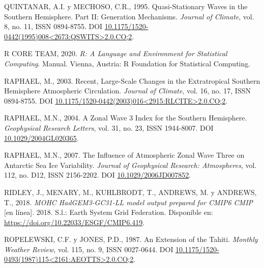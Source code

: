\documentclass[12pt,oneside,a4paper]{reedthesis}
\newlength{\cslhangindent}
\newenvironment{CSLReferences}[2] %
 {%
  \setlength{\parindent}{0pt}
  \ifodd #1 \everypar{\setlength{\hangindent}{\cslhangindent}}\ignorespaces\fi
  \ifnum #2 > 0
  \setlength{\parskip}{#2\baselineskip}
  \fi
 }%
 {}
\begin{document}
\begin{CSLReferences}{1}{0}
\leavevmode{}%
QUINTANAR, A.I. y MECHOSO, C.R., 1995. Quasi-{Stationary Waves} in the {Southern Hemisphere}. {Part II}: {Generation Mechanisms}. \emph{Journal of Climate}, vol. 8, no. 11, ISSN 0894-8755. DOI \href{https://doi.org/10.1175/1520-0442(1995)008\%3C2673:QSWITS\%3E2.0.CO;2}{10.1175/1520-0442(1995)008\textless2673:QSWITS\textgreater2.0.CO;2}.

\leavevmode{}%
R CORE TEAM, 2020. \emph{R: {A} Language and Environment for Statistical Computing}. Manual. {Vienna, Austria}: {R Foundation for Statistical Computing}.

\leavevmode{}%
RAPHAEL, M., 2003. Recent, {Large-Scale Changes} in the {Extratropical Southern Hemisphere Atmospheric Circulation}. \emph{Journal of Climate}, vol. 16, no. 17, ISSN 0894-8755. DOI \href{https://doi.org/10.1175/1520-0442(2003)016\%3C2915:RLCITE\%3E2.0.CO;2}{10.1175/1520-0442(2003)016\textless2915:RLCITE\textgreater2.0.CO;2}.

\leavevmode{}%
RAPHAEL, M.N., 2004. A Zonal Wave 3 Index for the {Southern Hemisphere}. \emph{Geophysical Research Letters}, vol. 31, no. 23, ISSN 1944-8007. DOI \href{https://doi.org/10.1029/2004GL020365}{10.1029/2004GL020365}.

\leavevmode{}%
RAPHAEL, M.N., 2007. The Influence of Atmospheric Zonal Wave Three on {Antarctic} Sea Ice Variability. \emph{Journal of Geophysical Research: Atmospheres}, vol. 112, no. D12, ISSN 2156-2202. DOI \href{https://doi.org/10.1029/2006JD007852}{10.1029/2006JD007852}.

\leavevmode{}%
RIDLEY, J., MENARY, M., KUHLBRODT, T., ANDREWS, M. y ANDREWS, T., 2018. \emph{MOHC HadGEM3-GC31-LL model output prepared for CMIP6 CMIP} {[}en línea{]}. 2018. S.l.: Earth System Grid Federation. Disponible en: \url{https://doi.org/10.22033/ESGF/CMIP6.419}.

\leavevmode{}%
ROPELEWSKI, C.F. y JONES, P.D., 1987. An {Extension} of the {Tahiti}. \emph{Monthly Weather Review}, vol. 115, no. 9, ISSN 0027-0644. DOI \href{https://doi.org/10.1175/1520-0493(1987)115\%3C2161:AEOTTS\%3E2.0.CO;2}{10.1175/1520-0493(1987)115\textless2161:AEOTTS\textgreater2.0.CO;2}.


\end{CSLReferences}
\end{document}
